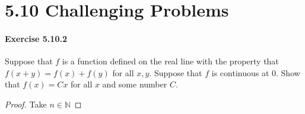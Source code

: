 \documentclass[11pt]{article}
\def \N {\mathbb{N}}
\begin{document}
\section*{5.10 Challenging Problems}
\paragraph{Exercise 5.10.2} Suppose that $f$ is a function defined on the real line with the property that $f(x+y) = f(x) + f(y)$ for all $x,y$.
Suppose that $f$ is continuous at 0.
Show that $f(x) = Cx$ for all $x$ and some number $C$.

\begin{proof}
	Take $ n \in \N $   
\end{proof}
\end{document}
